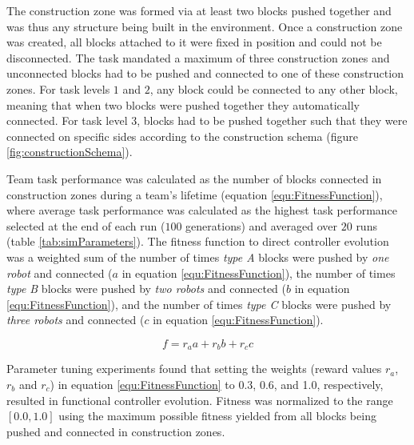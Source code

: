 \documentclass[conference]{IEEEtran}
\DeclareRobustCommand{\hlcyan}[1]{{\sethlcolor{cyan}\hl{#1}}}
\begin{document}
The construction zone was formed via at least two blocks pushed together and
was thus any structure being built in the environment.
Once a construction zone was created, all blocks attached to it were fixed in position
and could not be disconnected.
The task mandated a maximum of three construction zones and unconnected blocks
had to be pushed and connected to one of these construction zones.
For task levels $1$ and $2$, any block could be connected to any other block,
meaning that when two blocks were pushed
together they automatically connected.
For task level $3$, blocks had to be pushed together such
that they were connected on specific sides according to the construction schema
(figure \ref{fig:constructionSchema}).

Team task performance was calculated as the number of blocks connected in construction zones
during a team's lifetime (equation \ref{equ:FitnessFunction}),
where average task performance was calculated as the highest task
performance selected at the end of each run ($100$ generations) and averaged over $20$ runs
(table \ref{tab:simParameters}).
The fitness function to direct controller evolution was a weighted sum of
the number of times \textit{type A} blocks were pushed by \textit{one robot}
and connected (\(a\) in equation \ref{equ:FitnessFunction}), the number of times \textit{type B} blocks were pushed
by \textit{two robots} and connected (\(b\) in equation \ref{equ:FitnessFunction}),
and the number of times \textit{type C} blocks were pushed by \textit{three robots}
and connected (\(c\) in equation \ref{equ:FitnessFunction}).

\begin{equation}\label{equ:FitnessFunction}
	f = r_a a + r_b b + r_c c
\end{equation}

Parameter tuning experiments found that setting the weights (reward values \(r_a\), \(r_b\) and \(r_c\))
in equation \ref{equ:FitnessFunction} to 0.3, 0.6, and 1.0, respectively, resulted in functional controller evolution.
Fitness was normalized to the range \([0.0, 1.0]\) using the maximum possible fitness yielded from
all blocks being pushed and connected in construction zones.
\end{document}
